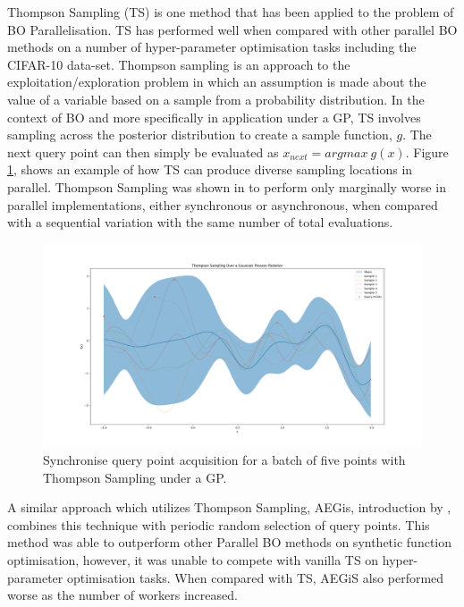 			Thompson Sampling (TS) is one method that has been applied to the problem of BO Parallelisation\cite{26}\cite{27}. TS has performed well when compared with other parallel BO methods on a number of hyper-parameter optimisation tasks including the CIFAR-10 data-set. 
			Thompson sampling is an approach to the exploitation/exploration problem in which an assumption is made about the value of a variable based on a sample from a probability distribution. In the context of BO and more specifically in application under a GP, TS involves sampling across the posterior distribution to create a sample function, \(g\). The next query point can then simply be evaluated as \(x_{next} = argmax ~g(x)\). Figure \ref{fig:TS1}, shows an example of how TS can produce diverse sampling locations in parallel. Thompson Sampling was shown in \cite{27} to perform only marginally worse in parallel implementations, either synchronous or asynchronous, when compared with a sequential variation with the same number of total evaluations.



			\begin{figure}[h]	


			\includegraphics[trim=20 0 0 0 ,scale=0.25]{TS.png}

			\caption{Synchronise query point acquisition for a batch of five points with Thompson Sampling under a GP.}
			\label{fig:TS1}

			\end{figure}


			A similar approach which utilizes Thompson Sampling, AEGis, introduction by \cite{26}, combines this technique with periodic random selection of query points. This method was able to outperform other Parallel BO methods on synthetic function optimisation, however, it was unable to compete with vanilla TS on hyper-parameter optimisation tasks. When compared with TS, AEGiS also performed worse as the number of workers increased.


